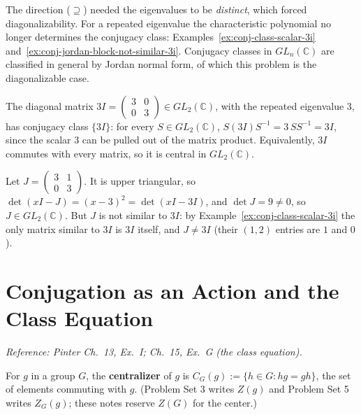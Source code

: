 \documentclass[11pt]{report}
\begin{document}
\begin{rembox}\label{rem:what-argument-uses}
The direction ($\supseteq$) needed the eigenvalues to be \emph{distinct}, which forced diagonalizability. For a repeated eigenvalue the characteristic polynomial no longer determines the conjugacy class: Examples~\ref{ex:conj-class-scalar-3i} and~\ref{ex:conj-jordan-block-not-similar-3i}. Conjugacy classes in $GL_n(\mathbb{C})$ are classified in general by Jordan normal form, of which this problem is the diagonalizable case.
\end{rembox}

\begin{exbox}\label{ex:conj-class-scalar-3i}
The diagonal matrix $3I = \begin{pmatrix} 3 & 0 \\ 0 & 3 \end{pmatrix} \in GL_2(\mathbb{C})$, with the repeated eigenvalue $3$, has conjugacy class $\{3I\}$: for every $S \in GL_2(\mathbb{C})$, $S(3I)S^{-1} = 3\,SS^{-1} = 3I$, since the scalar $3$ can be pulled out of the matrix product. Equivalently, $3I$ commutes with every matrix, so it is central in $GL_2(\mathbb{C})$.
\end{exbox}

\begin{exbox}\label{ex:conj-jordan-block-not-similar-3i}
Let $J = \begin{pmatrix} 3 & 1 \\ 0 & 3 \end{pmatrix}$. It is upper triangular, so $\det(xI - J) = (x - 3)^2 = \det(xI - 3I)$, and $\det J = 9 \neq 0$, so $J \in GL_2(\mathbb{C})$. But $J$ is not similar to $3I$: by Example~\ref{ex:conj-class-scalar-3i} the only matrix similar to $3I$ is $3I$ itself, and $J \neq 3I$ (their $(1,2)$ entries are $1$ and $0$).
\end{exbox}

\section{Conjugation as an Action and the Class Equation}\label{sec:conjugation-action}

\textit{Reference: Pinter Ch.\ 13, Ex.\ I; Ch.\ 15, Ex.\ G (the class equation).}

\begin{defbox}[{Centralizer}]\label{def:centralizer}
For $g$ in a group $G$, the \textbf{centralizer} of $g$ is $C_G(g) := \{h \in G : hg = gh\}$, the set of elements commuting with $g$. (Problem Set 3 writes $Z(g)$ and Problem Set 5 writes $Z_G(g)$; these notes reserve $Z(G)$ for the center.)
\end{defbox}
\end{document}
